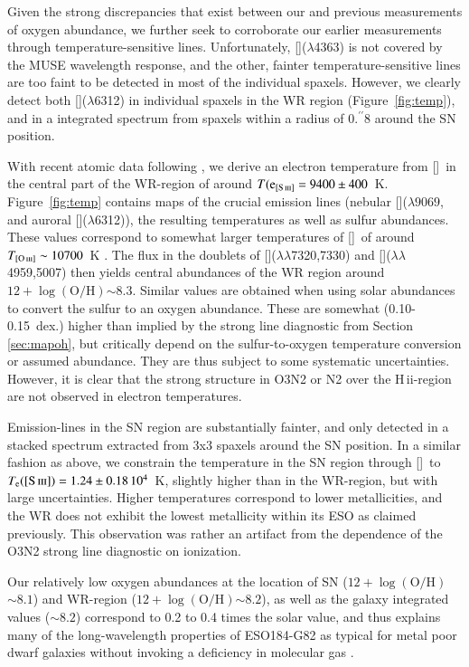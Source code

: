 \documentclass[traditabstract]{aa}
\newcommand{\farc}{\hbox{$.\!\!^{\prime\prime}$}}
\newcommand{\hii}{\mbox{H\,{\sc ii}}}
\newcommand{\oh}{$12+\log(\mathrm{O/H})$}
\newcommand{\siii}{[\ion{S}{iii}]}
\newcommand{\oii}{[\ion{O}{ii}]}
\newcommand{\oiii}{[\ion{O}{iii}]}
\begin{document}
Given the strong discrepancies that exist between our and previous measurements of oxygen abundance, we further seek to corroborate our earlier measurements through temperature-sensitive lines. Unfortunately, \oiii($\lambda$4363) is not covered by the MUSE wavelength response, and the other, fainter temperature-sensitive lines are too faint to be detected in most of the individual spaxels. However, we clearly detect both \siii($\lambda$6312) in individual spaxels in the WR region  (Figure~\ref{fig:temp}), and in a integrated spectrum from spaxels within a radius of 0\farc{8} around the SN position. 

With recent atomic data following \citet{2013ApJS..207...21N}, we derive an electron temperature from \siii\, in the central part of the WR-region of around $T(\mathrm{e}_{\siii}=9400\pm400$~K. Figure~\ref{fig:temp} contains maps of the crucial emission lines (nebular \siii($\lambda9069$, and auroral \siii($\lambda$6312)), the resulting temperatures as well as sulfur abundances. These values correspond to somewhat larger temperatures of \oiii~of around $T_{\oiii} \sim 10700$~K \citep{2006A&A...448..955I, 2012A&A...547A..29B}. The flux in the doublets of \oii($\lambda\lambda$7320,7330) and \oiii($\lambda\lambda$4959,5007) then yields central abundances of the WR region around \oh $\sim 8.3$. Similar values are obtained when using solar abundances to convert the sulfur to an oxygen abundance. These are somewhat (0.10-0.15~dex.) higher than implied by the strong line diagnostic from Section \ref{sec:mapoh}, but critically depend on the sulfur-to-oxygen temperature conversion or assumed abundance. They are thus subject to some systematic uncertainties. However, it is clear that the strong structure in O3N2 or N2 over the \hii-region are not observed in electron temperatures.

Emission-lines in the SN region are substantially fainter, and only detected in a stacked spectrum extracted from 3x3 spaxels around the SN position. In a similar fashion as above, we constrain the temperature in the SN region through \siii\, to $T_{\mathrm{e}}(\siii)=1.24\pm0.18\, 10^{4}$~K, slightly higher than in the WR-region, but with large uncertainties. Higher temperatures correspond to lower metallicities, and the WR does not exhibit the lowest metallicity within its ESO as claimed previously. This observation was rather an artifact from the dependence of the O3N2 strong line diagnostic on ionization.

Our relatively low oxygen abundances at the location of SN (\oh$\sim8.1$) and WR-region (\oh$\sim8.2$), as well as the galaxy integrated values ($\sim8.2$) correspond to 0.2 to 0.4 times the solar value, and thus explains many of the long-wavelength properties of ESO184-G82 as typical for metal poor dwarf galaxies without invoking a deficiency in molecular gas \citep{2016arXiv160901742M}.
\end{document}

